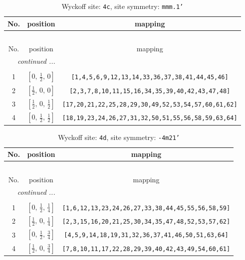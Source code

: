 \documentclass[fleqn,8pt]{jsarticle}
\begin{document}
\renewcommand{\arraystretch}{1.2}
\begin{longtable}{ccc}
\caption{Wyckoff site: {\tt 4c}, site symmetry: {\tt mmm.1'}}
 \\
 \hline \hline
No. & position & mapping \\ \hline \endfirsthead

\multicolumn{2}{l}{\tablename\ \thetable{}} \\
 \hline \hline
No. & position & mapping \\ \hline \endhead

 \hline \hline
\multicolumn{2}{r}{\footnotesize\it continued ...} \\ \endfoot

 \hline \hline
\multicolumn{2}{r}{} \\ \endlastfoot

1 & $\left[ 0,\, \frac{1}{2},\, 0 \right]$ & {\tt [1,4,5,6,9,12,13,14,33,36,37,38,41,44,45,46]} \\ \hline
2 & $\left[ \frac{1}{2},\, 0,\, 0 \right]$ & {\tt [2,3,7,8,10,11,15,16,34,35,39,40,42,43,47,48]} \\ \hline
3 & $\left[ \frac{1}{2},\, 0,\, \frac{1}{2} \right]$ & {\tt [17,20,21,22,25,28,29,30,49,52,53,54,57,60,61,62]} \\ \hline
4 & $\left[ 0,\, \frac{1}{2},\, \frac{1}{2} \right]$ & {\tt [18,19,23,24,26,27,31,32,50,51,55,56,58,59,63,64]} \\
\end{longtable}
\renewcommand{\arraystretch}{1.2}
\begin{longtable}{ccc}
\caption{Wyckoff site: {\tt 4d}, site symmetry: {\tt -4m21'}}
 \\
 \hline \hline
No. & position & mapping \\ \hline \endfirsthead

\multicolumn{2}{l}{\tablename\ \thetable{}} \\
 \hline \hline
No. & position & mapping \\ \hline \endhead

 \hline \hline
\multicolumn{2}{r}{\footnotesize\it continued ...} \\ \endfoot

 \hline \hline
\multicolumn{2}{r}{} \\ \endlastfoot

1 & $\left[ 0,\, \frac{1}{2},\, \frac{1}{4} \right]$ & {\tt [1,6,12,13,23,24,26,27,33,38,44,45,55,56,58,59]} \\ \hline
2 & $\left[ \frac{1}{2},\, 0,\, \frac{1}{4} \right]$ & {\tt [2,3,15,16,20,21,25,30,34,35,47,48,52,53,57,62]} \\ \hline
3 & $\left[ 0,\, \frac{1}{2},\, \frac{3}{4} \right]$ & {\tt [4,5,9,14,18,19,31,32,36,37,41,46,50,51,63,64]} \\ \hline
4 & $\left[ \frac{1}{2},\, 0,\, \frac{3}{4} \right]$ & {\tt [7,8,10,11,17,22,28,29,39,40,42,43,49,54,60,61]} \\
\end{longtable}
\end{document}
